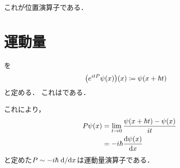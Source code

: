 これが位置演算子である．

\section{運動量}
\onepara を
\begin{align}
		\qty(e^{itP}\psi(x))(x) &\coloneqq \psi(x + \hbar t)
\end{align}
と定める．
これは\onepara である．

これにより，
\begin{align}
		P\psi(x) &= \lim_{t\to 0}\frac{\psi(x+\hbar t)-\psi(x)}{it}\\
		  &= -i\hbar\dv{\psi(x)}{x}
\end{align}
と定めた$P \sim -i\hbar\dv*{}{x}$は運動量演算子である．
